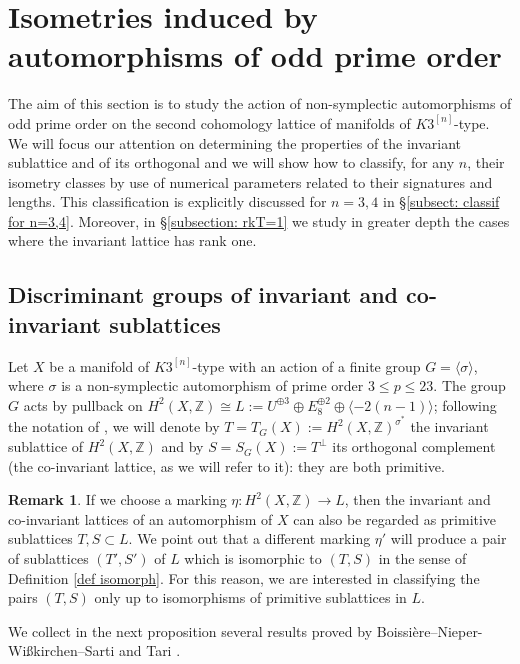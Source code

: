 \documentclass{amsart}
\theoremstyle{definition}
\newtheorem{rem}[theorem]{Remark}
\newcommand{\ra}{\rightarrow}
\newcommand{\IZ}{\mathbb{Z}}
\newcommand{\coloneqq}{:=}
\newcommand{\hskn}{K3^{\left[n\right]}}
\begin{document}
\section{Isometries induced by automorphisms of odd prime order}\label{section: isometries}

The aim of this section is to study the action of non-symplectic automorphisms of odd prime order on the second cohomology lattice of manifolds of $\hskn$-type. We will focus our attention on determining the properties of the invariant sublattice and of its orthogonal and we will show how to classify, for any $n$, their isometry classes by use of numerical parameters related to their signatures and lengths. This classification is explicitly discussed for $n=3,4$ in \S \ref{subsect: classif for n=3,4}. Moreover, in \S \ref{subsection: rkT=1} we study in greater depth the cases where the invariant lattice has rank one.

\subsection{Discriminant groups of invariant and co-invariant sublattices}\label{subsection: induced isom}
Let $X$ be a manifold of $\hskn$-type with an action of a finite group $G = \langle \sigma \rangle$, where $\sigma$ is a  non-symplectic automorphism of prime order $3 \leq p \leq 23$. The group $G$ acts by pullback on $H^2(X, \IZ) \cong L \coloneqq U^{\oplus 3}\oplus E_8^{\oplus 2} \oplus \langle-2(n-1)\rangle$; following the notation of \cite{smith}, we will denote by $T = T_G(X) \coloneqq H^2(X, \IZ)^{\sigma^*}$ the invariant sublattice of $H^2(X,\IZ)$  and by $S = S_G(X) \coloneqq T^\perp$ its orthogonal complement (the co-invariant lattice, as we will refer to it): they are both primitive.

\begin{rem}\label{equiv pairs S,T}
If we choose a marking $\eta: H^2(X, \IZ) \ra L$, then the invariant and co-invariant lattices of an automorphism of $X$ can also be regarded as primitive sublattices $T,S \subset L$. We point out that a different marking $\eta'$ will produce a pair of sublattices $(T',S')$ of $L$ which is isomorphic to $(T,S)$ in the sense of Definition \ref{def isomorph}. For this reason, we are interested in classifying the pairs $(T,S)$ only up to isomorphisms of primitive sublattices in $L$.
\end{rem}

We collect in the next proposition several results proved by Boissi\`ere--Nieper-Wi{\ss}kirchen--Sarti \cite{smith} and Tari \cite{tari}.
\end{document}
